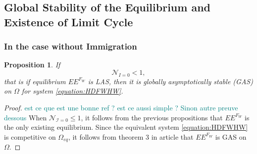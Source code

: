 \documentclass{article}
\newcommand{\cI}{\mathcal{I}}
\newcommand{\marc}[1]{\textcolor{teal}{#1}}
\newtheorem{prop}{Proposition}
\begin{document}
\subsection{Global Stability of the Equilibrium and Existence of Limit Cycle}

\subsubsection{In the case without Immigration}

\begin{prop}\label{prop:EEFGAS}If 
$$
\mathcal{N}_{I =0} < 1,
$$
that is if equilibrium $EE^{F_W}$ is LAS, then it is globally asymptotically stable (GAS) on $\Omega$ for system \eqref{equation:HDFWHW}.
\end{prop}

\begin{proof} \marc{est ce que \cite{anguelov_monotone_2010} est une bonne ref ? est ce aussi simple ? Sinon autre preuve dessous}
When $\mathcal{N}_{\cI = 0} \leq 1$, it follows from the previous propositions that $EE^{F_W}$ is the only existing equilibrium. Since the equivalent system \eqref{equation:HDFWHW} is competitive on $\Omega_{eq}$, it follows from theorem 3 in article \cite{anguelov_monotone_2010} that $EE^{F_W}$ is GAS on $\Omega$.
\end{proof}
\end{document}
